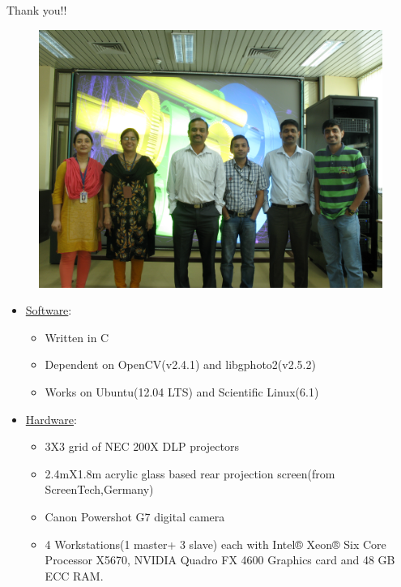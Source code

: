 \documentclass{beamer}
\begin{document}
\begin{frame}{Thank you!!}
\begin{figure}
\includegraphics[width=\textwidth,height=\textheight]{figures/ThankYou.jpg}
\end{figure}
\end{frame}


\appendix


\begin{frame}[label=sysconfg]
\begin{itemize}
\item \underline{Software}:
\begin{itemize}
\item Written in C
\item Dependent on OpenCV(v2.4.1) and libgphoto2(v2.5.2)
\item Works on Ubuntu(12.04 LTS) and Scientific Linux(6.1)
\end{itemize}      
\item \underline{Hardware}:
\begin{itemize}
\item 3X3 grid of NEC 200X DLP projectors
\item 2.4mX1.8m acrylic glass based rear projection screen(from ScreenTech,Germany)
\item Canon Powershot G7 digital camera
\item 4 Workstations(1 master+ 3 slave) each with Intel® Xeon® Six Core Processor X5670, NVIDIA Quadro FX 4600 Graphics card and 48 GB ECC RAM.
\end{itemize}
\end{itemize}
\end{frame}

\end{document}

